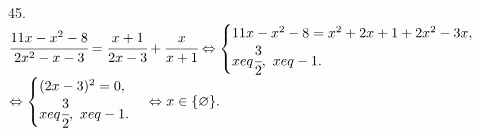 45. $\cfrac{11x-x^2-8}{2x^2-x-3}=\cfrac{x+1}{2x-3}+\cfrac{x}{x+1}\Leftrightarrow \begin{cases} 11x-x^2-8=x^2+2x+1+2x^2-3x,\\ x
eq\cfrac{3}{2},\ x
eq-1.\end{cases}$\\$
\Leftrightarrow \begin{cases} (2x-3)^2=0,\\ x
eq\cfrac{3}{2},\ x
eq-1.\end{cases}\Leftrightarrow x\in\{\varnothing\}.$\\
